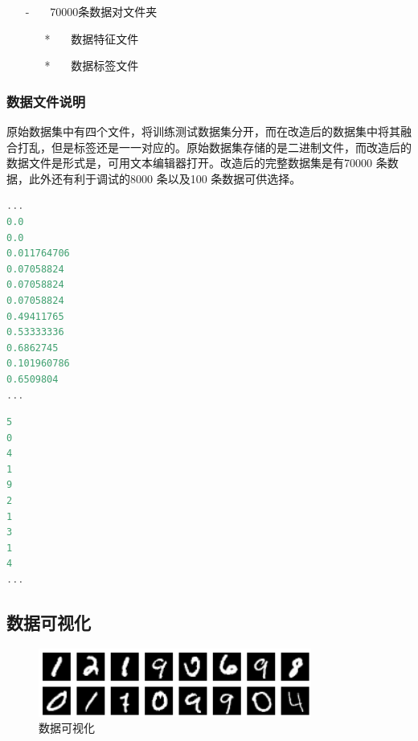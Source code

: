 \documentclass[UTF-8]{progbookcn}
\begin{document}
\begin{itemize}
\begin{itemize}
\begin{itemize}
\begin{itemize}
\begin{enumerate}
\begin{enumerate}
                      \end{enumerate}
                      \item[-] ~~~70000条数据对文件夹
                      \begin{enumerate}
                        \item[*] ~~~数据特征文件
                        \item[*] ~~~数据标签文件
                      \end{enumerate}
                    \end{enumerate}
                  \end{itemize}
                \end{itemize}
          \end{itemize}
\end{itemize}



\subsubsection{数据文件说明}
原始数据集中有四个文件，将训练测试数据集分开，而在改造后的数据集中将其融合打乱，但是标签还是一一对应的。原始数据集存储的是二进制文件，而改造后的数据文件是形式是，可用文本编辑器打开。改造后的完整数据集是有70000 条数据，此外还有利于调试的8000 条以及100 条数据可供选择。
\begin{lstlisting}[language=C,caption={.$\backslash$DataSet$\backslash$MinstHandWriting$\backslash$Transformation$\backslash$MinstHW-70000$\backslash$DataFeatrue.msd}]
...
0.0
0.0
0.011764706
0.07058824
0.07058824
0.07058824
0.49411765
0.53333336
0.6862745
0.101960786
0.6509804
...
\end{lstlisting}

\begin{lstlisting}[language=C,caption={.$\backslash$DataSet$\backslash$MinstHandWriting$\backslash$Transformation$\backslash$MinstHW-70000$\backslash$DataLabel.msd}]
5
0
4
1
9
2
1
3
1
4
...
\end{lstlisting}

\subsection{数据可视化}
\begin{figure}[!h]
  \centering
  \includegraphics[width=0.8\textwidth]{minstHW.png}
  \caption{数据可视化}\label{fg:MinstHW}
\end{figure}
\end{document}
